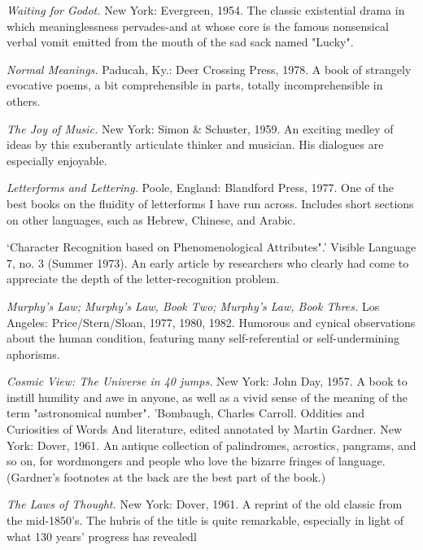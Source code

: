 {\sl Waiting for Godot.} New York: Evergreen, 1954. The classic existential drama in which meaninglessness pervades-and at whose core is the famous nonsensical verbal vomit emitted from the mouth of the sad sack named "Lucky".

 {\sl Normal Meanings.} Paducah, Ky.: Deer Crossing Press, 1978. A book of strangely evocative poems, a bit comprehensible in parts, totally incomprehensible in others.

 {\sl The Joy of Music.} New York: Simon \& Schuster, 1959. An exciting medley of ideas by this exuberantly articulate thinker and musician. His dialogues are especially enjoyable.

 {\sl Letterforms and Lettering.} Poole, England: Blandford Press, 1977. One of the best books on the fluidity of letterforms I have run across. Includes short sections on other languages, such as Hebrew, Chinese, and Arabic.

 `Character Recognition based on Phenomenological Attributes".' Visible Language 7, no. 3 (Summer 1973). An early article by researchers who clearly had come to appreciate the depth of the letter-recognition problem.

 {\sl Murphy's Law; Murphy's Law, Book Two; Murphy's Law, Book Thres.} Los Angeles: Price/Stern/Sloan, 1977, 1980, 1982. Humorous and cynical observations about the human condition, featuring many self-referential or self-undermining aphorisms.

 {\sl Cosmic View: The Universe in 40 jumps.} New York: John Day, 1957. A book to instill humility and awe in anyone, as well as a vivid sense of the meaning of the term "astronomical number". 'Bombaugh, Charles Carroll. Oddities and Curiosities of Words And literature, edited annotated by Martin Gardner. New York: Dover, 1961. An antique collection of palindromes, acrostics, pangrams, and so on, for wordmongers and people who love the bizarre fringes of language. (Gardner's footnotes at the back are the best part of the book.)

 {\sl The Laws of Thought.} New York: Dover, 1961. A reprint of the old classic from the mid-1850's. The hubris of the title is quite remarkable, especially in light of what 130 years' progress has revealedl

